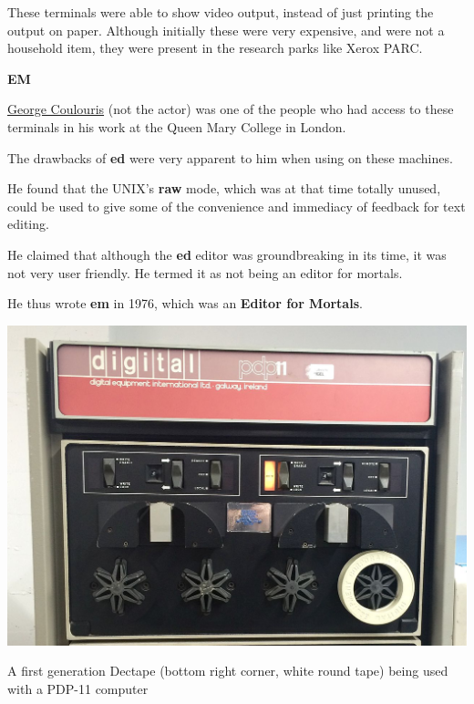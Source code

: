 These terminals were able to show video output, instead of
just printing the output on paper.
Although initially these were very expensive, and were not
a household item, they were present in the research parks
like Xerox PARC.

\textbf{EM}

\href{https://en.wikipedia.org/wiki/George\_Coulouris\_(computer\_scientist)}{George Coulouris}
(not the actor)
was one of the people who had access to these terminals
in his work at the Queen Mary College in London.

The drawbacks of \textbf{ed} were very apparent to him
when using on these machines.

He found that the UNIX's \textbf{raw} mode, which was
at that time totally unused,
could be used to give some of the convenience
and immediacy of feedback for text editing.

He claimed that although the \textbf{ed} editor was
groundbreaking in its time, it was not very user friendly.
He termed it as not being an editor for mortals.

He thus wrote \textbf{em} in 1976, which was an \textbf{Editor for Mortals}.


\begin{marginfigure}
  \includegraphics{images/png/dectape-pdp11.png}
  \caption{A first generation Dectape
  (bottom right corner, white round tape)
  being used with a PDP-11 computer}
\end{marginfigure}


